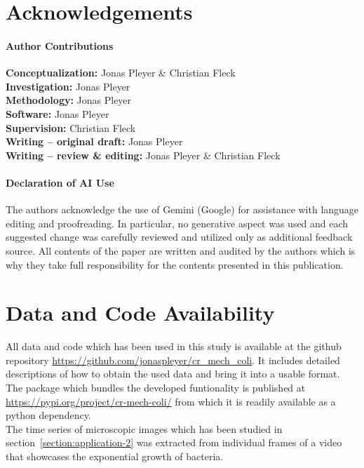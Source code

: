 \documentclass[10pt,letterpaper]{article}
\begin{document}
\newpage
\section*{Acknowledgements}
\paragraph{Author Contributions}
\textbf{Conceptualization:} Jonas Pleyer \& Christian Fleck\\
\textbf{Investigation:} Jonas Pleyer\\
\textbf{Methodology:} Jonas Pleyer\\
\textbf{Software:} Jonas Pleyer\\
\textbf{Supervision:} Christian Fleck\\
\textbf{Writing – original draft:} Jonas Pleyer\\
\textbf{Writing – review \& editing:} Jonas Pleyer \& Christian Fleck

\paragraph*{Declaration of AI Use}
The authors acknowledge the use of Gemini (Google) for assistance with language editing and
proofreading.
In particular, no generative aspect was used and each suggested change was carefully reviewed and
utilized only as additional feedback source.
All contents of the paper are written and audited by the authors which is why they take full
responsibility for the contents presented in this publication.

\section*{Data and Code Availability}
\label{section:data-code-availability}
All data and code which has been used in this study is available at the github repository
\url{https://github.com/jonaspleyer/cr\_mech\_coli}.
It includes detailed descriptions of how to obtain the used data and bring it into a usable format.
The package which bundles the developed funtionality is published at
\url{https://pypi.org/project/cr-mech-coli/} from which it is readily available as a python
dependency.\\
The time series of microscopic images which has been studied in section~\ref{section:application-2}
was extracted from individual frames of a video~\cite{Trude1982} that
showcases the exponential growth of bacteria.

\nolinenumbers
\newpage

\end{document}
